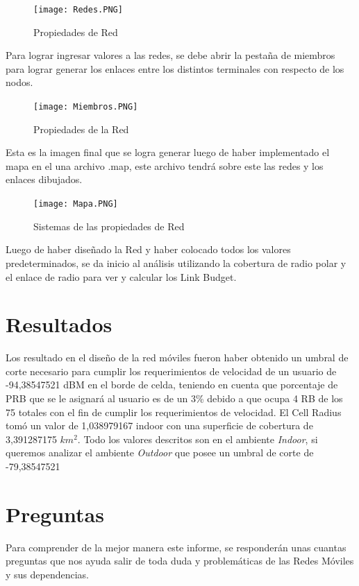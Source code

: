 \documentclass[Article, letterpaper,12pt]{article}
\begin{document}
\begin{figure}[H]
    \centering
    \texttt{[image: Redes.PNG]}
    \caption{Propiedades de Red}
    \label{fig:my_label}
\end{figure}

Para lograr ingresar valores a las redes, se debe abrir la pestaña de miembros para lograr generar los enlaces entre los distintos terminales con respecto de los nodos.
\begin{figure}[H]
    \centering
    \texttt{[image: Miembros.PNG]}
    \caption{Propiedades de la Red}
    \label{fig:my_label}
\end{figure}

Esta es la imagen final que se logra generar luego de haber implementado el mapa en el una archivo .map, este archivo tendrá sobre este las redes y los enlaces dibujados.

\begin{figure}[H]
    \centering
    \texttt{[image: Mapa.PNG]}
    \caption{Sistemas de las propiedades de Red}
    \label{fig:my_label}
\end{figure}

Luego de haber diseñado la Red y haber colocado todos los valores predeterminados, se da inicio al análisis utilizando la cobertura de radio polar y el enlace de radio para ver y calcular los Link Budget.

\section{Resultados}
 Los resultado en el diseño de la red móviles fueron haber obtenido un umbral de corte necesario para cumplir los requerimientos de velocidad de un usuario de  -94,38547521 dBM en el borde de celda, teniendo en cuenta que porcentaje de PRB que se le asignará al usuario es de un 3\% debido a que ocupa 4 RB de los 75 totales  con el fin de cumplir los requerimientos de velocidad.
 El Cell Radius tomó un valor de 1,038979167 indoor con una superficie de cobertura de 3,391287175 $km^{2}$. Todo los valores descritos son en el ambiente \textit{Indoor}, si queremos analizar el ambiente \textit{Outdoor} que posee un umbral de corte de -79,38547521


\section{Preguntas}
Para comprender de la mejor manera este informe, se responderán unas cuantas preguntas que nos ayuda salir de toda duda y problemáticas de las Redes Móviles y sus dependencias.
\end{document}
